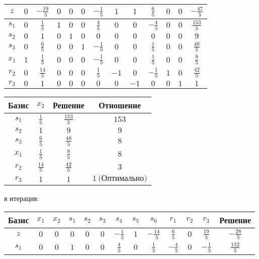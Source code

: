 \documentclass{article}%
\begin{document}
\begin{flushleft}
\begin{tabular}{|c|ccccccccccc|c|}
\hline%
$z$&$0$&$-\frac{19}{5}$&$0$&$0$&$0$&$-\frac{1}{5}$&$1$&$1$&$\frac{6}{5}$&$0$&$0$&$-\frac{47}{5}$\\%
\hline%
$s_{1}$&$0$&$\frac{1}{5}$&$1$&$0$&$0$&$\frac{4}{5}$&$0$&$0$&$-\frac{4}{5}$&$0$&$0$&$\frac{153}{5}$\\%
$s_{2}$&$0$&$1$&$0$&$1$&$0$&$0$&$0$&$0$&$0$&$0$&$0$&$9$\\%
$s_{3}$&$0$&$\frac{6}{5}$&$0$&$0$&$1$&$-\frac{1}{5}$&$0$&$0$&$\frac{1}{5}$&$0$&$0$&$\frac{48}{5}$\\%
$x_{1}$&$1$&$\frac{1}{5}$&$0$&$0$&$0$&$-\frac{1}{5}$&$0$&$0$&$\frac{1}{5}$&$0$&$0$&$\frac{8}{5}$\\%
$r_{2}$&$0$&$\frac{14}{5}$&$0$&$0$&$0$&$\frac{1}{5}$&$-1$&$0$&$-\frac{1}{5}$&$1$&$0$&$\frac{42}{5}$\\%
$r_{3}$&$0$&$1$&$0$&$0$&$0$&$0$&$0$&$-1$&$0$&$0$&$1$&$1$\\%
\hline%
\end{tabular}%
\newline%
\newline%
\newline%
\begin{tabular}{|cccc|}%
\hline%
Базис&$x_{2}$&Решение&Отношение\\%
\hline%
$s_{1}$&$\frac{1}{5}$&$\frac{153}{5}$&$153$\\%
$s_{2}$&$1$&$9$&$9$\\%
$s_{3}$&$\frac{6}{5}$&$\frac{48}{5}$&$8$\\%
$x_{1}$&$\frac{1}{5}$&$\frac{8}{5}$&$8$\\%
$r_{2}$&$\frac{14}{5}$&$\frac{42}{5}$&$3$\\%
$r_{3}$&$1$&$1$&$1\: \text{(Оптимально)}$\\%
\hline%
\end{tabular}%
\newline%
\newline%
я итерация: %
\newline%
\newline%
\renewcommand{\arraystretch}{1.3}%
\begin{tabular}{|c|ccccccccccc|c|}%
\hline%
Базис&$x_{1}$&$x_{2}$&$s_{1}$&$s_{2}$&$s_{3}$&$s_{4}$&$s_{5}$&$s_{6}$&$r_{1}$&$r_{2}$&$r_{3}$&Решение\\%
\hline%
$z$&$0$&$0$&$0$&$0$&$0$&$-\frac{1}{5}$&$1$&$-\frac{14}{5}$&$\frac{6}{5}$&$0$&$\frac{19}{5}$&$-\frac{28}{5}$\\%
\hline%
$s_{1}$&$0$&$0$&$1$&$0$&$0$&$\frac{4}{5}$&$0$&$\frac{1}{5}$&$-\frac{4}{5}$&$0$&$-\frac{1}{5}$&$\frac{152}{5}$\\%

\end{tabular}
\end{flushleft}
\end{document}
